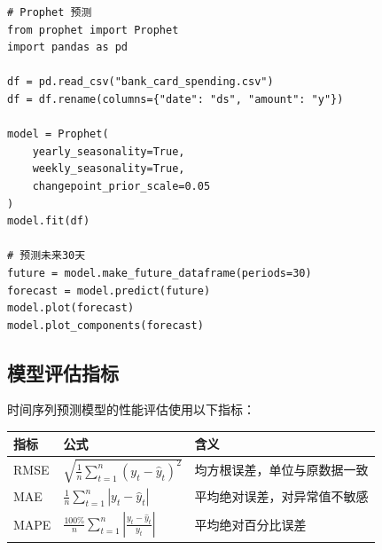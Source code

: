 \begin{lstlisting}[style=python]
# Prophet 预测
from prophet import Prophet
import pandas as pd

df = pd.read_csv("bank_card_spending.csv")
df = df.rename(columns={"date": "ds", "amount": "y"})

model = Prophet(
    yearly_seasonality=True,
    weekly_seasonality=True,
    changepoint_prior_scale=0.05
)
model.fit(df)

# 预测未来30天
future = model.make_future_dataframe(periods=30)
forecast = model.predict(future)
model.plot(forecast)
model.plot_components(forecast)
\end{lstlisting}

\subsection{模型评估指标}

时间序列预测模型的性能评估使用以下指标：

\begin{table}[H]
\centering
\begin{tabular}{lll}
\toprule
\textbf{指标} & \textbf{公式} & \textbf{含义} \\
\midrule
RMSE & $\sqrt{\frac{1}{n}\sum_{t=1}^{n}(y_t - \hat{y}_t)^2}$ & 均方根误差，单位与原数据一致 \\
MAE & $\frac{1}{n}\sum_{t=1}^{n}|y_t - \hat{y}_t|$ & 平均绝对误差，对异常值不敏感 \\
MAPE & $\frac{100\%}{n}\sum_{t=1}^{n}\left|\frac{y_t - \hat{y}_t}{y_t}\right|$ & 平均绝对百分比误差 \\
\bottomrule
\end{tabular}
\end{table}

